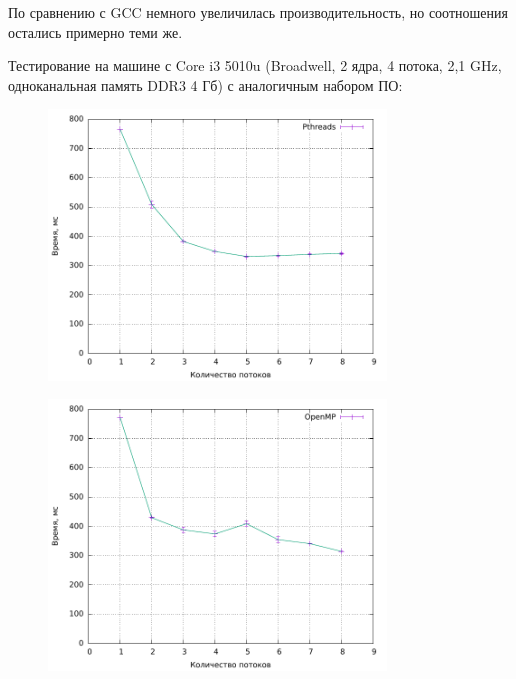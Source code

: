 По сравнению с GCC немного увеличилась производительность, но соотношения остались примерно теми же.

Тестирование на машине с Core i3 5010u (Broadwell, 2 ядра, 4 потока, 2,1 GHz, одноканальная память DDR3 4 Гб) с аналогичным набором ПО:

\begin{figure}[H]
	\centering
	\includegraphics[width=0.8\textwidth]{../plot_laptop/plotPth.pdf}
	\caption{}
\end{figure}

\begin{figure}[H]
	\centering
	\includegraphics[width=0.8\textwidth]{../plot_laptop/plotMp.pdf}
	\caption{}
\end{figure}

